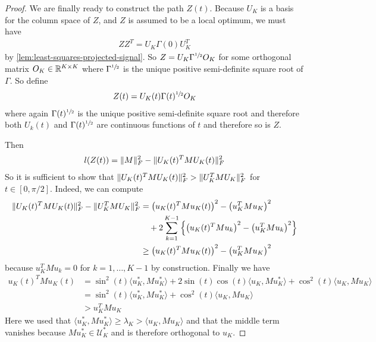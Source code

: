 \begin{proof}
    We are finally ready to construct the path $Z(t)$.
    Because $U_K$ is a basis for the column space of $Z$, and $Z$ is assumed to be a local optimum, we must have
    \begin{align*}
        Z Z^T = U_K \Gamma(0) U_K^T
    \end{align*}
    by \cref{lem:least-squares-projected-signal}.
    So $Z = U_K \Gamma^{\sfrac{1}{2}} O_K$ for some orthogonal matrix $O_K \in \mathbb{R}^{K \times K}$ where $\Gamma^{\sfrac{1}{2}}$ is the unique positive semi-definite square root of $\Gamma$.
    So define
    \begin{align*}
        Z(t) = U_K(t) \Gamma(t)^{\sfrac{1}{2}} O_K
    \end{align*}
    where again $\Gamma(t)^{\sfrac{1}{2}}$ is the unique positive semi-definite square root and therefore both $U_k(t)$ and  $\Gamma(t)^{\sfrac{1}{2}}$ are continuous functions of $t$ and therefore so is $Z$.

    Then
    \begin{align}\label{eq:objective-decreases-as-signal-increases}
    l(Z(t)) = \lVert M\rVert_F^2 - \lVert U_K(t)^T M U_K(t)\rVert_F^2
    \end{align}
    So it is sufficient to show that $\lVert U_K(t)^T M U_K(t)\rVert_F^2 > \lVert U_K^T M U_K\rVert_F^2$ for $t \in [0, \pi/2]$.
    Indeed, we can compute
    \begin{align*}
        \lVert U_K(t)^T M U_K(t)\rVert_F^2 - \lVert U_K^T M U_K\rVert_F^2
        &= \left(u_K(t)^T M u_K(t)\right)^2 - \left(u_K^T M u_K\right)^2 \\
        & \quad + 2 \sum_{k=1}^{K-1} \left\{ \left(u_K(t)^T M u_k\right)^2 - \left(u_K^T M u_k\right)^2 \right\} \\
        &\geq \left(u_K(t)^T M u_K(t)\right)^2 - \left(u_K^T M u_K\right)^2
    \end{align*}
    because $u_K^T M u_k = 0$ for $k = 1, \dots, K-1$ by construction.
    Finally we have
    \begin{align*}
        u_K(t)^T M u_K(t)
        &= \sin^2(t) \langle u_K^*, M u_K^* \rangle + 2 \sin(t)\cos(t) \langle u_K, M u_K^* \rangle + \cos^2(t) \langle u_K, M u_K \rangle \\
        &= \sin^2(t) \langle u_K^*, M u_K^* \rangle + \cos^2(t) \langle u_K, M u_K \rangle \\
        &> u_K^T M u_K
    \end{align*}
    Here we used that $\langle u_K^*, M u_K^* \rangle \geq \lambda_K > \langle u_K, M u_K \rangle$ and that the middle term vanishes because $M u_K^* \in \mathcal{U}^*_K$ and is therefore orthogonal to $u_K$.

\end{proof}


